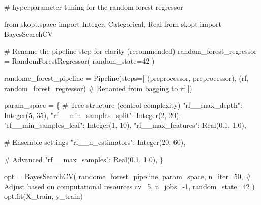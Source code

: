 \documentclass[
  letterpaper,
  DIV=11,
  numbers=noendperiod]{scrreprt}
\newenvironment{Shaded}{\begin{snugshade}}{\end{snugshade}}
\newcommand{\CommentTok}[1]{\textcolor[rgb]{0.37,0.37,0.37}{#1}}
\newcommand{\DecValTok}[1]{\textcolor[rgb]{0.68,0.00,0.00}{#1}}
\newcommand{\FloatTok}[1]{\textcolor[rgb]{0.68,0.00,0.00}{#1}}
\newcommand{\ImportTok}[1]{\textcolor[rgb]{0.00,0.46,0.62}{#1}}
\newcommand{\NormalTok}[1]{\textcolor[rgb]{0.00,0.23,0.31}{#1}}
\newcommand{\OperatorTok}[1]{\textcolor[rgb]{0.37,0.37,0.37}{#1}}
\newcommand{\StringTok}[1]{\textcolor[rgb]{0.13,0.47,0.30}{#1}}
\begin{document}
\begin{Shaded}
\begin{Highlighting}[]
\CommentTok{\# hyperparameter tuning for the random forest regressor}

\ImportTok{from}\NormalTok{ skopt.space }\ImportTok{import}\NormalTok{ Integer, Categorical, Real}
\ImportTok{from}\NormalTok{ skopt }\ImportTok{import}\NormalTok{ BayesSearchCV}

\CommentTok{\# Rename the pipeline step for clarity (recommended)}
\NormalTok{random\_forest\_regressor }\OperatorTok{=}\NormalTok{ RandomForestRegressor(}
\NormalTok{    random\_state}\OperatorTok{=}\DecValTok{42}
\NormalTok{)}

\NormalTok{randome\_forest\_pipeline }\OperatorTok{=}\NormalTok{ Pipeline(steps}\OperatorTok{=}\NormalTok{[}
\NormalTok{    (}\StringTok{\textquotesingle{}preprocessor\textquotesingle{}}\NormalTok{, preprocessor),}
\NormalTok{    (}\StringTok{\textquotesingle{}rf\textquotesingle{}}\NormalTok{, random\_forest\_regressor)  }\CommentTok{\# Renamed from \textquotesingle{}bagging\textquotesingle{} to \textquotesingle{}rf\textquotesingle{}}
\NormalTok{])}

\NormalTok{param\_space }\OperatorTok{=}\NormalTok{ \{}
    \CommentTok{\# Tree structure (control complexity)}
    \StringTok{"rf\_\_max\_depth"}\NormalTok{: Integer(}\DecValTok{5}\NormalTok{, }\DecValTok{35}\NormalTok{),  }
    \StringTok{"rf\_\_min\_samples\_split"}\NormalTok{: Integer(}\DecValTok{2}\NormalTok{, }\DecValTok{20}\NormalTok{),}
    \StringTok{"rf\_\_min\_samples\_leaf"}\NormalTok{: Integer(}\DecValTok{1}\NormalTok{, }\DecValTok{10}\NormalTok{),}
    \StringTok{"rf\_\_max\_features"}\NormalTok{: Real(}\FloatTok{0.1}\NormalTok{, }\FloatTok{1.0}\NormalTok{),}
    
    \CommentTok{\# Ensemble settings}
    \StringTok{"rf\_\_n\_estimators"}\NormalTok{: Integer(}\DecValTok{20}\NormalTok{, }\DecValTok{60}\NormalTok{),}
    
    \CommentTok{\# Advanced}
    \StringTok{"rf\_\_max\_samples"}\NormalTok{: Real(}\FloatTok{0.1}\NormalTok{, }\FloatTok{1.0}\NormalTok{),}
\NormalTok{\}}

\NormalTok{opt }\OperatorTok{=}\NormalTok{ BayesSearchCV(}
\NormalTok{    randome\_forest\_pipeline,}
\NormalTok{    param\_space,}
\NormalTok{    n\_iter}\OperatorTok{=}\DecValTok{50}\NormalTok{,  }\CommentTok{\# Adjust based on computational resources}
\NormalTok{    cv}\OperatorTok{=}\DecValTok{5}\NormalTok{,}
\NormalTok{    n\_jobs}\OperatorTok{={-}}\DecValTok{1}\NormalTok{,}
\NormalTok{    random\_state}\OperatorTok{=}\DecValTok{42}
\NormalTok{)}
\NormalTok{opt.fit(X\_train, y\_train)  }
\end{Highlighting}
\end{Shaded}
\end{document}
